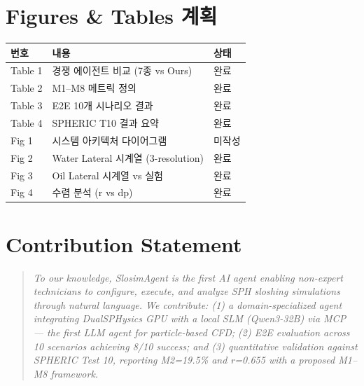\documentclass[11pt,a4paper]{article}
\begin{document}
\section{Figures \& Tables 계획}

\begin{tabular}{lll}
\toprule
\textbf{번호} & \textbf{내용} & \textbf{상태} \\
\midrule
Table 1 & 경쟁 에이전트 비교 (7종 vs Ours) & 완료 \\
Table 2 & M1--M8 메트릭 정의 & 완료 \\
Table 3 & E2E 10개 시나리오 결과 & 완료 \\
Table 4 & SPHERIC T10 결과 요약 & 완료 \\
Fig 1 & 시스템 아키텍처 다이어그램 & 미작성 \\
Fig 2 & Water Lateral 시계열 (3-resolution) & 완료 \\
Fig 3 & Oil Lateral 시계열 vs 실험 & 완료 \\
Fig 4 & 수렴 분석 (r vs dp) & 완료 \\
\bottomrule
\end{tabular}

\section{Contribution Statement}

\begin{quote}
\textit{To our knowledge, SlosimAgent is the first AI agent enabling non-expert technicians to configure, execute, and analyze SPH sloshing simulations through natural language. We contribute: (1) a domain-specialized agent integrating DualSPHysics GPU with a local SLM (Qwen3-32B) via MCP --- the first LLM agent for particle-based CFD; (2) E2E evaluation across 10 scenarios achieving 8/10 success; and (3) quantitative validation against SPHERIC Test 10, reporting M2=19.5\% and r=0.655 with a proposed M1--M8 framework.}
\end{quote}
\end{document}
